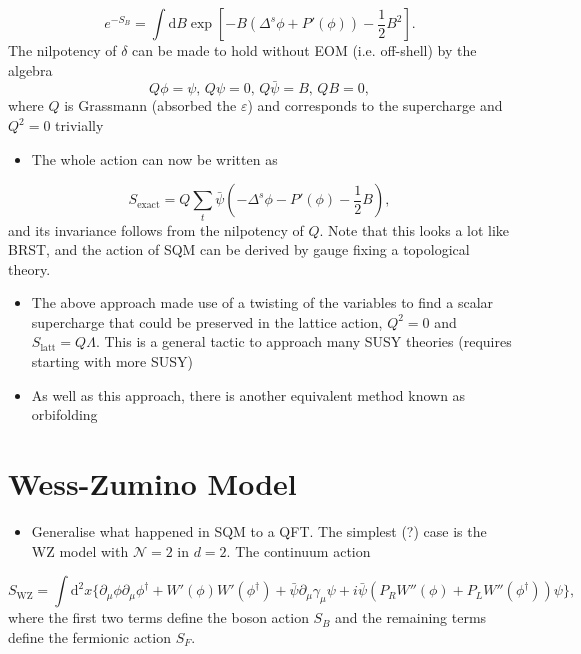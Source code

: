 \begin{equation}
    e^{-S_B} = \int \text{d}B \exp\left[ -B(\Delta^s\phi + P'(\phi)) - \frac{1}{2}B^2\right].
\end{equation}
The nilpotency of $\delta$ can be made to hold without EOM (i.e. off-shell) by the algebra
\begin{equation}
    Q \phi = \psi, \, Q \psi = 0, \, Q \bar{\psi} = B, \, Q B = 0,
\end{equation}
where $Q$ is Grassmann (absorbed the $\varepsilon$) and corresponds to the supercharge and $Q^2 = 0$ trivially
\begin{itemize}
    \item The whole action can now be written as
\end{itemize}
\begin{equation}
    S_\text{exact} = Q \sum_t \bar{\psi}\left(-\Delta^s\phi - P'(\phi) - \frac{1}{2}B\right),
\end{equation}
and its invariance follows from the nilpotency of $Q$. Note that this looks a lot like BRST, and the action of SQM can be derived by gauge fixing a topological theory.
\begin{itemize}
    \item The above approach made use of a twisting of the variables to find a scalar supercharge that could be preserved in the lattice action, $Q^2 = 0$ and $S_\text{latt} = Q \Lambda$. This is a general tactic to approach many SUSY theories (requires starting with more SUSY)
    \item As well as this approach, there is another equivalent method known as orbifolding
\end{itemize}



\section{Wess-Zumino Model}
\begin{itemize}
    \item Generalise what happened in SQM to a QFT. The simplest (?) case is the WZ model with $\mathcal{N}=2$ in $d=2$. The continuum action
\end{itemize}
\begin{equation}
    S_\text{WZ} = \int \text{d}^2 x \{\partial_\mu \phi \partial_\mu \phi^\dagger + W'(\phi) W'(\phi^\dagger) + \bar{\psi} \partial_\mu \gamma_\mu \psi + i \bar{\psi}(P_R W''(\phi) + P_L W''(\phi^\dagger)) \psi\},
\end{equation}
where the first two terms define the boson action $S_B$ and the remaining terms define the fermionic action $S_F$.

